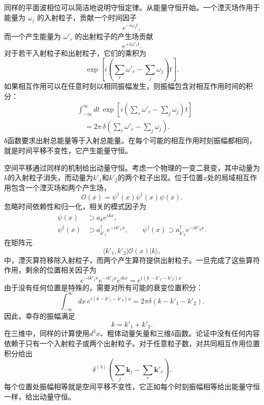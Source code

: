 同样的平面波相位可以简洁地说明守恒定律。从能量守恒开始。一个湮灭场作用于能量为 \(\omega_j\) 的入射粒子，贡献一个时间因子
\begin{equation}
e^{-i\omega_j t},
\end{equation}
而一个产生能量为 \(\omega'_r\) 的出射粒子的产生场贡献
\begin{equation}
e^{+i\omega'_r t}.
\end{equation}
对于若干入射粒子和出射粒子，它们的乘积为
\begin{equation}
\exp\!\left[
i\left(\sum_r\omega'_r-\sum_j\omega_j\right)t
\right].
\end{equation}
如果相互作用可以在任意时刻以相同振幅发生，则振幅包含对相互作用时间的积分：
\begin{equation}
\begin{aligned}
&\int_{-\infty}^{\infty}dt\,
\exp\!\left[
i\left(\sum_r\omega'_r-\sum_j\omega_j\right)t
\right]
\\
&\quad =2\pi\,
\delta\!\left(\sum_r\omega'_r-\sum_j\omega_j\right).
\end{aligned}
\end{equation}
{\proseunicodefont δ}函数要求出射总能量等于入射总能量。在每个可能的相互作用时刻振幅都相同，就是时间平移不变性，它产生能量守恒。

空间平移通过同样的机制给出动量守恒。考虑一个物理的一变二衰变，其中动量为\(k\)的入射粒子消失，而动量为\(k'_1\)和\(k'_2\)的两个粒子出现。位于位置\(x\)处的局域相互作用包含一个湮灭场和两个产生场，
\begin{equation}
\mathcal{O}(x)=\psi^\dagger(x)\psi^\dagger(x)\psi(x).
\end{equation}
忽略时间依赖性和归一化，相关的模式因子为
\begin{align}
\psi(x)&\supset a_k e^{ikx},
\\
\psi^\dagger(x)&\supset a_{k'_1}^\dagger e^{-ik'_1x},
\qquad
\psi^\dagger(x)\supset a_{k'_2}^\dagger e^{-ik'_2x}.
\end{align}
在矩阵元
\begin{equation}
\langle k'_1,k'_2|\mathcal{O}(x)|k\rangle,
\end{equation}
中，湮灭算符移除入射粒子，而两个产生算符提供出射粒子。一旦完成了这些算符作用，剩余的位置相关因子为
\begin{equation}
e^{-ik'_1x}e^{-ik'_2x}e^{ikx}
=e^{i(k-k'_1-k'_2)x}.
\end{equation}
由于没有任何位置是特殊的，需要对所有可能的衰变位置积分：
\begin{equation}
\int_{-\infty}^{\infty}dx\,
e^{i(k-k'_1-k'_2)x}
=2\pi\delta(k-k'_1-k'_2).
\end{equation}
因此，幸存的振幅满足
\begin{equation}
k=k'_1+k'_2.
\end{equation}
在三维中，同样的计算使用\(d^3x\)、粗体动量矢量和三维{\proseunicodefont δ}函数。论证中没有任何内容依赖于只有一个入射粒子或两个出射粒子。对于任意粒子数，对共同相互作用位置积分给出
\begin{equation}
\delta^{(3)}\!\left(
\sum_j\mathbf{k}_j-\sum_r\mathbf{k}'_r
\right).
\end{equation}
每个位置处振幅相等就是空间平移不变性，它正如每个时刻振幅相等给出能量守恒一样，给出动量守恒。

